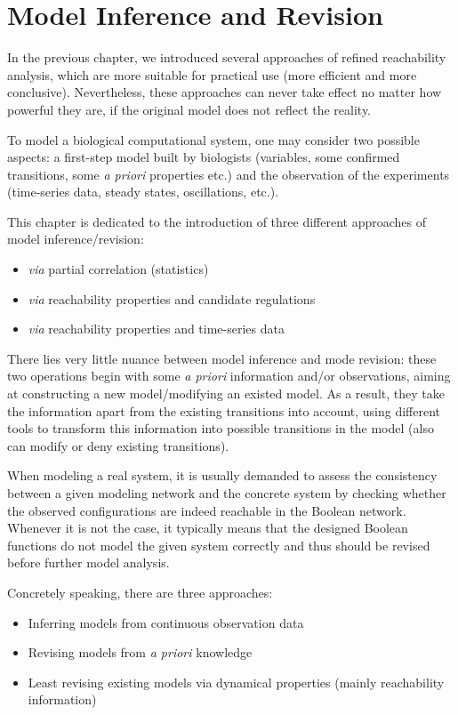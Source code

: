 \chapter{Model Inference and Revision}
\begin{mybox}
In the previous chapter, we introduced several approaches of refined reachability analysis, which are more suitable for practical use (more efficient and more conclusive).
Nevertheless, these approaches can never take effect no matter how powerful they are, if the original model does not reflect the reality.

To model a biological computational system, one may consider two possible aspects: a first-step model built by biologists (variables, some confirmed transitions, some \textit{a priori} properties etc.) and the observation of the experiments (time-series data, steady states, oscillations, etc.).

This chapter is dedicated to the introduction of three different approaches of model inference/revision:

\begin{itemize}
    \item \textit{via} partial correlation (statistics)
    \item \textit{via} reachability properties and candidate regulations
    \item \textit{via} reachability properties and time-series data
\end{itemize}

There lies very little nuance between model inference and mode revision: these two operations begin with some \textit{a priori} information and/or observations, aiming at constructing a new model/modifying an existed model.
As a result, they take the information apart from the existing transitions into account, using different tools to transform this information into possible transitions in the model (also can modify or deny existing transitions).

\end{mybox}

When modeling a real system, it is usually demanded to assess the consistency between a given modeling network and the concrete system by checking whether the observed configurations are indeed reachable in the Boolean network.
Whenever it is not the case, it typically means that the designed Boolean functions do not model the given system correctly and thus should be revised before further model analysis.

Concretely speaking, there are three approaches:
\begin{itemize}
    \item Inferring models from continuous observation data
    \item Revising models from \textit{a priori} knowledge
    \item Least revising existing models via dynamical properties (mainly reachability information)
\end{itemize}

